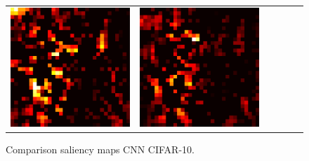 \documentclass[preprint,12pt]{elsarticle}
\begin{document}
\begin{figure}[ht]
\begin{tabular}{cccccc}
  \includegraphics[scale=\scale]{../visualizations/examples/cifar10/cnn/active_saliency_map/2.png} & 
  \includegraphics[scale=\scale]{../visualizations/examples/cifar10/cnn/inactive_saliency_map/2.png} \\
  \end{tabular}
  \caption{Comparison saliency maps CNN CIFAR-10.}
  \label{fig: comparison saliency maps cnn cifar10}
\end{figure}
\end{document}
